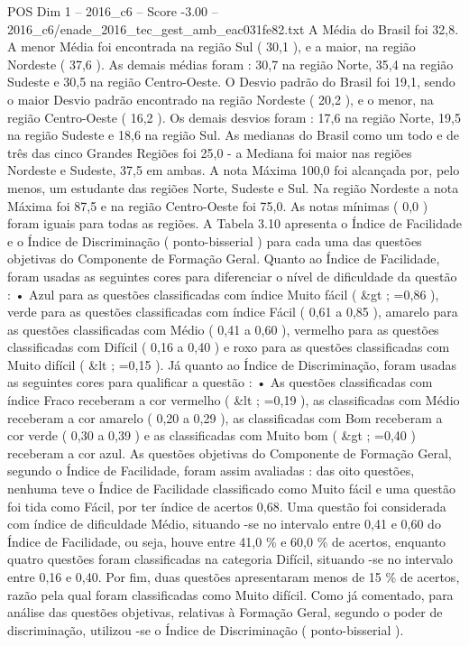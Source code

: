 \begin{textsample}{POS Dim 1 – 2016\_c6 – Score -3.00 – 2016\_c6/enade\_2016\_tec\_gest\_amb\_eac031fe82.txt}
A Média do Brasil foi 32,8.
A menor Média foi encontrada na região Sul ( 30,1 ), e a maior, na região Nordeste ( 37,6 ).
As demais médias foram : 30,7 na região Norte, 35,4 na região Sudeste e 30,5 na região Centro-Oeste.
O Desvio padrão do Brasil foi 19,1, sendo o maior Desvio padrão encontrado na região Nordeste ( 20,2 ), e o menor, na região Centro-Oeste ( 16,2 ).
Os demais desvios foram : 17,6 na região Norte, 19,5 na região Sudeste e 18,6 na região Sul.
As medianas do Brasil como um todo e de três das cinco Grandes Regiões foi 25,0 - a Mediana foi maior nas regiões Nordeste e Sudeste, 37,5 em ambas.
A nota Máxima 100,0 foi alcançada por, pelo menos, um estudante das regiões Norte, Sudeste e Sul.
Na região Nordeste a nota Máxima foi 87,5 e na região Centro-Oeste foi 75,0.
As notas mínimas ( 0,0 ) foram iguais para todas as regiões.
A Tabela 3.10 apresenta o Índice de Facilidade e o Índice de Discriminação ( ponto-bisserial ) para cada uma das questões objetivas do Componente de Formação Geral.
Quanto ao Índice de Facilidade, foram usadas as seguintes cores para diferenciar o nível de dificuldade da questão : • Azul para as questões classificadas com índice Muito fácil ( \&gt ; =0,86 ), verde para as questões classificadas com índice Fácil ( 0,61 a 0,85 ), amarelo para as questões classificadas com Médio ( 0,41 a 0,60 ), vermelho para as questões classificadas com Difícil ( 0,16 a 0,40 ) e roxo para as questões classificadas com Muito difícil ( \&lt ; =0,15 ).
Já quanto ao Índice de Discriminação, foram usadas as seguintes cores para qualificar a questão : • As questões classificadas com índice Fraco receberam a cor vermelho ( \&lt ; =0,19 ), as classificadas com Médio receberam a cor amarelo ( 0,20 a 0,29 ), as classificadas com Bom receberam a cor verde ( 0,30 a 0,39 ) e as classificadas com Muito bom ( \&gt ; =0,40 ) receberam a cor azul.
As questões objetivas do Componente de Formação Geral, segundo o Índice de Facilidade, foram assim avaliadas : das oito questões, nenhuma teve o Índice de Facilidade classificado como Muito fácil e uma questão foi tida como Fácil, por ter índice de acertos 0,68.
Uma questão foi considerada com índice de dificuldade Médio, situando -se no intervalo entre 0,41 e 0,60 do Índice de Facilidade, ou seja, houve entre 41,0 \% e 60,0 \% de acertos, enquanto quatro questões foram classificadas na categoria Difícil, situando -se no intervalo entre 0,16 e 0,40.
Por fim, duas questões apresentaram menos de 15 \% de acertos, razão pela qual foram classificadas como Muito difícil.
Como já comentado, para análise das questões objetivas, relativas à Formação Geral, segundo o poder de discriminação, utilizou -se o Índice de Discriminação ( ponto-bisserial ).

\end{textsample}
